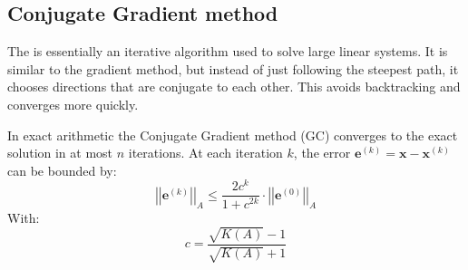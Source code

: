 \subsection{Conjugate Gradient method}

The  is essentially an iterative algorithm used to solve large linear systems. It is similar to the gradient method, but instead of just following the steepest path, it chooses directions that are conjugate to each other. This avoids backtracking and converges more quickly.

\highspace
\begin{theorem}
    In exact arithmetic the Conjugate Gradient method (GC) converges to the exact solution in at most $n$ iterations. At each iteration $k$, the error $\mathbf{e}^{\left(k\right)} = \mathbf{x} - \mathbf{x}^{\left(k\right)}$ can be bounded by:
    \begin{equation}\label{eq: bound error conjugate gradient}
        {\left|\left|\mathbf{e}^{\left(k\right)}\right|\right|}_{A} \le \dfrac{
            2c^{k}
        }{
            1+c^{2k}
        }
        \cdot
        {\left|\left|\mathbf{e}^{\left(0\right)}\right|\right|}_{A}
    \end{equation}
    With:
    \begin{equation}\label{eq: bound c conjugate gradient}
        c = \dfrac{
            \sqrt{K\left(A\right)} - 1
        }{
            \sqrt{K\left(A\right)} + 1
        }
    \end{equation}
\end{theorem}

